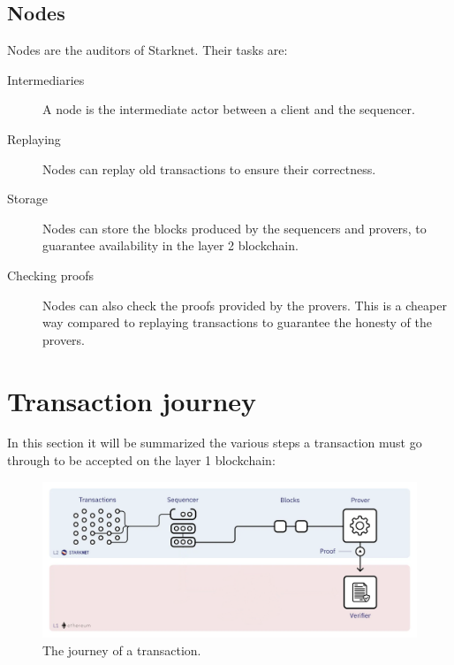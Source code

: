 \documentclass[12pt]{article}
\begin{document}
\subsection{Nodes} \label{subsection:nodes}
Nodes are the auditors of Starknet. Their tasks are:
\begin{description}
    \item[Intermediaries] A node is the intermediate actor between a client and the sequencer.
    \item[Replaying] Nodes can replay old transactions to ensure their correctness. 
    \item[Storage] Nodes can store the blocks produced by the sequencers and provers, to guarantee availability in the layer 2 blockchain.
    \item[Checking proofs] Nodes can also check the proofs provided by the provers. This is a cheaper way compared to replaying transactions to guarantee the honesty of the provers.  
\end{description}

\section{Transaction journey} \label{section:transaction_journey}
In this section it will be summarized the various steps a transaction must go through to be accepted on the layer 1 blockchain:

\begin{figure}[ht]
    \centering
    \includegraphics[width=\textwidth]{l2_transaction_journey} 
    \caption{The journey of a transaction.}
    \label{figure:transaction_journey}
\end{figure}
\end{document}

